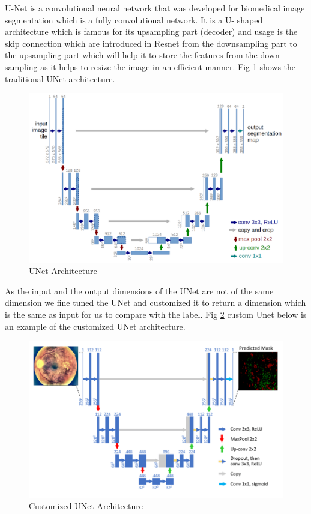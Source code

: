 \documentclass[conference]{IEEEtran}
\begin{document}
U-Net\cite{unet} is a convolutional neural network that was developed for biomedical image segmentation which is a fully convolutional network. It is a U- shaped architecture which is famous for its upsampling part (decoder) and usage is the skip connection which are introduced in Resnet\cite{res} from the downsampling part to the upsampling part which will help it to store the features from the down sampling as it helps to resize the image in an efficient manner. Fig \ref{fig:unet}  shows the traditional UNet architecture.

\par              
\begin{figure}[H]
	\centering
	\includegraphics[width=\linewidth]{image/unet.PNG}
	\caption{UNet Architecture}
	\label{fig:unet}
\end{figure}

\par 
As the input and the output dimensions of the UNet are not of the same dimension we fine tuned the UNet and customized it to return a dimension which is the same as input for us to compare with the label. Fig \ref{fig:unetcustom} custom Unet below is an example of the customized UNet architecture.

\par              
\begin{figure}[H]
	\centering
	\includegraphics[width=\linewidth]{image/customunet.PNG}
	\caption{Customized UNet Architecture}
	\label{fig:unetcustom}
\end{figure}
\end{document}
